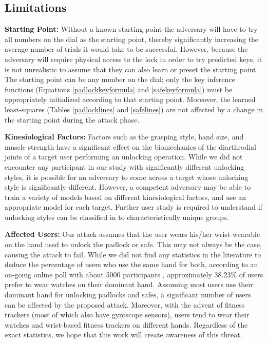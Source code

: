 \documentclass[]{IEEEtran}
\begin{document}
\subsection{Limitations}
\noindent
\textbf{Starting Point:}
Without a known starting point the adversary will have to try all numbers on the dial as the starting point, thereby significantly increasing the average number of trials it would take to be successful. However, because the adversary will require physical access to the lock in order to try predicted keys, it is not unrealistic to assume that they can also learn or preset the starting point. The starting point can be any number on the dial; only the key inference functions (Equations \ref{padlockkeyformula} and \ref{safekeyformula}) must be appropriately initialized according to that starting point. Moreover, the learned least-squares (Tables \ref{padlocklines} and \ref{safelines}) are not affected by a change in the starting point during the attack phase.

\noindent
\textbf{Kinesiological Factors:}
Factors such as the grasping style, hand size, and muscle strength have a significant effect on the biomechanics of the diarthrodial joints of a target user performing an unlocking operation. While we did not encounter any participant in our study with significantly different unlocking styles, it is possible for an adversary to come across a target whose unlocking style is significantly different. However, a competent adversary may be able to train a variety of models based on different kinesiological factors, and use an appropriate model for each target. Further user study is required to understand if unlocking styles can be classified in to characteristically unique groups.

\noindent
\textbf{Affected Users:}
Our attack assumes that the user wears his/her wrist-wearable on the hand used to unlock the padlock or safe. This may not always be the case, causing the attack to fail. While we did not find any statistics in the literature to deduce the percentage of users who use the same hand for both, according to an on-going online poll with about 5000 participants \cite{ablogtowatchpoll}, approximately 38.23\% of users prefer to wear watches on their dominant hand. Assuming most users use their dominant hand for unlocking padlocks and safes, a significant number of users can be affected by the proposed attack. Moreover, with the advent of fitness trackers (most of which also have gyroscope sensors), users tend to wear their watches and wrist-based fitness trackers on different hands. Regardless of the exact statistics, we hope that this work will create awareness of this threat.
\end{document}

